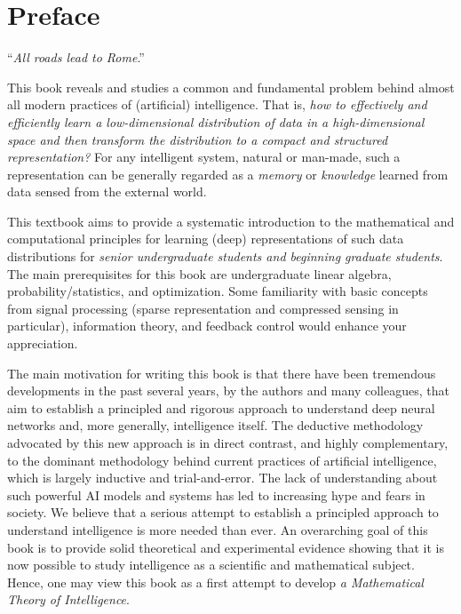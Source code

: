 \documentclass[../../book-main.tex]{subfiles}
\begin{document}
\chapter*{Preface}

\begin{center}
``{\em All roads lead to Rome}.''

\end{center}
\vspace{5mm}

This book reveals and studies a common and fundamental problem behind almost all modern practices of (artificial) intelligence. That is, {\em how to effectively and efficiently learn a low-dimensional distribution of data in a high-dimensional space and then transform the distribution to a compact and structured representation?} For any intelligent system, natural or man-made, such a representation can be generally regarded as a {\em memory} or {\em knowledge} learned from data sensed from the external world.

This textbook aims to provide a systematic introduction to the mathematical and computational principles for learning (deep) representations of such data distributions for {\em senior undergraduate students and beginning graduate students}. The main prerequisites for this book are undergraduate linear algebra, probability/statistics, and optimization. Some familiarity with basic concepts from signal processing (sparse representation and compressed sensing in particular), information theory, and feedback control would enhance your appreciation. 

The main motivation for writing this book is that there have been tremendous developments in the past several years, by the authors and many colleagues, that aim to establish a principled and rigorous approach to understand deep neural networks and, more generally, intelligence itself. The deductive methodology advocated by this new approach is in direct contrast, and highly complementary, to the dominant methodology behind current practices of artificial intelligence, which is largely inductive and trial-and-error. The lack of understanding about such powerful AI models and systems has led to increasing hype and fears in society. We believe that a serious attempt to establish a principled approach to understand intelligence is more needed than ever. An overarching goal of this book is to provide solid theoretical and experimental evidence showing that it is now possible to study intelligence as a scientific and mathematical subject. Hence, one may view this book as a first attempt to develop {\em a Mathematical Theory of Intelligence}.   
\end{document}
